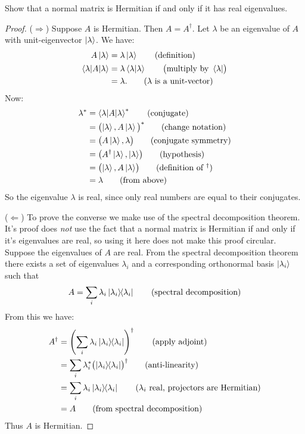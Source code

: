  Show that a normal matrix is Hermitian if and only if it has real eigenvalues.
\begin{proof}
	($\Rightarrow$) Suppose $A$ is Hermitian. Then $A=A^\dagger$.
	Let $\lambda$ be an eigenvalue of $A$ with unit-eigenvector $\ket{\lambda}$.  We have:
	\begin{align*}
		A \ket{\lambda} &= \lambda \ket{\lambda} \tag{definition} \\
		\braket{\lambda | A | \lambda} &= \lambda \braket{\lambda | \lambda} \tag*{$\bigl(\text{multiply by } \bra{\lambda}\bigr)$}\\
		& = \lambda. \tag{$\lambda$ is a unit-vector}
	\end{align*}
	Now:
	\begin{align*}
		\lambda^*  &= \braket{\lambda | A | \lambda}^* \tag{conjugate}\\
		&= \bigl(\ket{\lambda} , A\ket{\lambda}\bigl)^* \tag{change notation}\\
		&= \bigl(A\ket{\lambda},\lambda\bigr) \tag{conjugate symmetry} \\
		&= \bigl(A^\dagger\ket{\lambda}, \ket{\lambda}\bigr) \tag{hypothesis} \\
		&= \bigl(\ket{\lambda}, A\ket{\lambda}\bigr) \tag{definition of $^\dagger$} \\
		&= \lambda \tag{from above}
	\end{align*}
	So the eigenvalue $\lambda$ is real, since only real numbers are equal to their conjugates.
	
	\noindent($\Leftarrow$) To prove the converse we make use of the spectral decomposition theorem. It's proof does \textit{not} use the fact that a normal matrix is Hermitian if and only if it's eigenvalues are real, so using it here does not make this proof circular.  Suppose the eigenvalues of $A$ are real. From the spectral decomposition theorem there exists a set of eigenvalues $\lambda_i$ and a corresponding orthonormal basis $\ket{\lambda_i}$ such that
	\begin{align}
		A = \sum_i \lambda_i \ket{\lambda_i}\hspace{-1mm} \bra{\lambda_i} \tag{spectral decomposition}
	\end{align}
From this we have:
	\begin{align*}
		A^\dagger &= \left(\sum_i \lambda_i\ket{\lambda_i}\hspace{-1mm} \bra{\lambda_i}\right)^\dagger \tag{apply adjoint}\\
	&= \sum_i\lambda_i^*\bigl(\ket{\lambda_i}\hspace{-1mm} \bra{\lambda_i}\bigr)^\dagger \tag{anti-linearity}\\
	&= \sum_i \lambda_i \ket{\lambda_i}\hspace{-1mm} \bra{\lambda_i} \tag{$\lambda_i$ real, projectors are Hermitian}\\
								&= A \tag{from spectral decomposition}
	\end{align*}
	Thus $A$ is Hermitian.
\end{proof}

